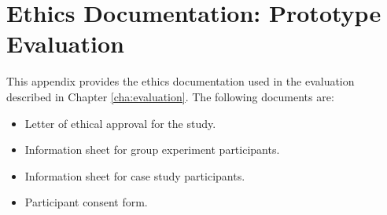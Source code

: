 \chapter{Ethics Documentation: Prototype Evaluation \label{cha:app5}}

This appendix provides the ethics documentation used in the evaluation described 
in Chapter \ref{cha:evaluation}. The following documents are:

\begin{itemize}
  \item Letter of ethical approval for the study.
  \item Information sheet for group experiment participants.
  \item Information sheet for case study participants.
  \item Participant consent form.
\end{itemize}








 
